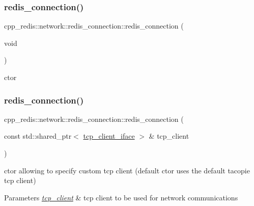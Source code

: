 \subsubsection{\texorpdfstring{redis\+\_\+connection()}{redis\_connection()}\hspace{0.1cm}{\footnotesize\ttfamily [1/3]}}
{\footnotesize\ttfamily cpp\+\_\+redis\+::network\+::redis\+\_\+connection\+::redis\+\_\+connection (\begin{DoxyParamCaption}\item[{void}]{ }\end{DoxyParamCaption})}



ctor 

\mbox{\label{classcpp__redis_1_1network_1_1redis__connection_a6880cfb2e1b037fcdaa5f0a6d515b375}} 
\subsubsection{\texorpdfstring{redis\+\_\+connection()}{redis\_connection()}\hspace{0.1cm}{\footnotesize\ttfamily [2/3]}}
{\footnotesize\ttfamily cpp\+\_\+redis\+::network\+::redis\+\_\+connection\+::redis\+\_\+connection (\begin{DoxyParamCaption}\item[{const std\+::shared\+\_\+ptr$<$ \hyperlink{classcpp__redis_1_1network_1_1tcp__client__iface}{tcp\+\_\+client\+\_\+iface} $>$ \&}]{tcp\+\_\+client }\end{DoxyParamCaption})\hspace{0.3cm}{\ttfamily [explicit]}}

ctor allowing to specify custom tcp client (default ctor uses the default tacopie tcp client)


\begin{DoxyParams}{Parameters}
{\em \hyperlink{classcpp__redis_1_1network_1_1tcp__client}{tcp\+\_\+client}} & tcp client to be used for network communications \\
\hline
\end{DoxyParams}
\mbox{\label{classcpp__redis_1_1network_1_1redis__connection_a9d392191ce262eddd5570b57e07aa051}} 
